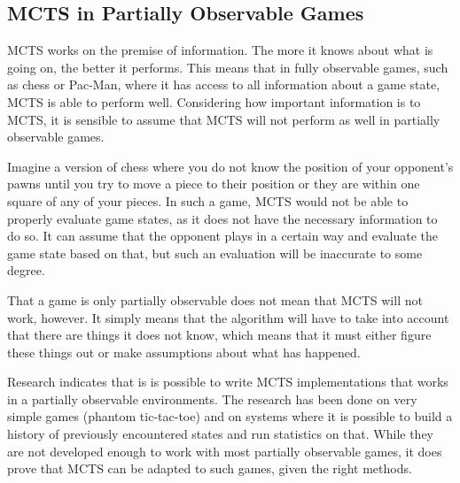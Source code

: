 \subsection{MCTS in Partially Observable Games}

MCTS works on the premise of information. The more it knows about what is going on, the better it performs. This means that in fully observable games, such as chess or Pac-Man, where it has access to all information about a game state, MCTS is able to perform well. Considering how important information is to MCTS, it is sensible to assume that MCTS will not perform as well in partially observable games. 

Imagine a version of chess where you do not know the position of your opponent's pawns until you try to move a piece to their position or they are within one square of any of your pieces. In such a game, MCTS would not be able to properly evaluate game states, as it does not have the necessary information to do so. It can assume that the opponent plays in a certain way and evaluate the game state based on that, but such an evaluation will be inaccurate to some degree.

That a game is only partially observable does not mean that MCTS will not work, however. It simply means that the algorithm will have to take into account that there are things it does not know, which means that it must either figure these things out or make assumptions about what has happened.

Research indicates that is is possible to write MCTS implementations that works in a partially observable environments. The research has been done on very simple games (phantom tic-tac-toe)\cite{auger2011multiple} and on systems where it is possible to build a history of previously encountered states and run statistics on that\cite{silver2010monte}\cite{thrun1999monte}. While they are not developed enough to work with most partially observable games, it does prove that MCTS can be adapted to such games, given the right methods.




